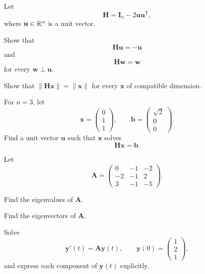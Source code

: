 \begin{problem}
Let
\[
\mathbf H=\mathbf I_n-2\mathbf u\mathbf u^{\mathsf T},
\]
where $\mathbf u\in\mathbb{R}^n$ is a unit vector.
\begin{problemsubparts}
\item Show that
\[
\mathbf H\mathbf u=-\mathbf u
\]
and
\[
\mathbf H\mathbf w=\mathbf w
\]
for every $\mathbf w\perp\mathbf u$.
\item Show that $\|\mathbf H\mathbf x\|=\|\mathbf x\|$ for every $\mathbf x$ of compatible dimension.
\item For $n=3$, let
\[
\mathbf x=
\begin{pmatrix}0\\1\\1\end{pmatrix},
\qquad
\mathbf b=
\begin{pmatrix}\sqrt2\\0\\0\end{pmatrix}.
\]
Find a unit vector $\mathbf u$ such that $\mathbf x$ solves
\[
\mathbf H\mathbf x=\mathbf b.
\]
\end{problemsubparts}
\end{problem}

\begin{problem}
Let
\[
\mathbf A=
\begin{pmatrix}
0&-1&-2\\
-2&-1&2\\
3&-1&-5
\end{pmatrix}.
\]
\begin{problemsubparts}
\item Find the eigenvalues of $\mathbf A$.
\item Find the eigenvectors of $\mathbf A$.
\item Solve
\[
\mathbf y'(t)=\mathbf A\mathbf y(t),
\qquad
\mathbf y(0)=
\begin{pmatrix}
1\\2\\1
\end{pmatrix},
\]
and express each component of $\mathbf y(t)$ explicitly.
\end{problemsubparts}
\end{problem}

